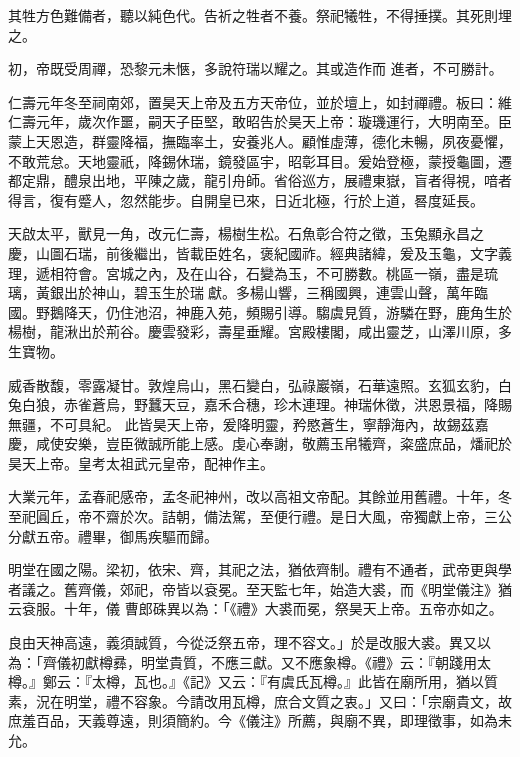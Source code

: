 \begin{pinyinscope}
 其牲方色難備者，聽以純色代。告祈之牲者不養。祭祀犧牲，不得捶撲。其死則埋之。



 初，帝既受周禪，恐黎元未愜，多說符瑞以耀之。其或造作而
 進者，不可勝計。



 仁壽元年冬至祠南郊，置昊天上帝及五方天帝位，並於壇上，如封禪禮。板曰：維仁壽元年，歲次作噩，嗣天子臣堅，敢昭告於昊天上帝：璇璣運行，大明南至。臣蒙上天恩造，群靈降福，撫臨率土，安養兆人。顧惟虛薄，德化未暢，夙夜憂懼，不敢荒怠。天地靈祇，降錫休瑞，鏡發區宇，昭彰耳目。爰始登極，蒙授龜圖，遷都定鼎，醴泉出地，平陳之歲，龍引舟師。省俗巡方，展禮東嶽，盲者得視，喑者得言，復有蹙人，忽然能步。自開皇已來，日近北極，行於上道，晷度延長。



 天啟太平，獸見一角，改元仁壽，楊樹生松。石魚彰合符之徵，玉兔顯永昌之
 慶，山圖石瑞，前後繼出，皆載臣姓名，褒紀國祚。經典諸緯，爰及玉龜，文字義理，遞相符會。宮城之內，及在山谷，石變為玉，不可勝數。桃區一嶺，盡是琉璃，黃銀出於神山，碧玉生於瑞獻。多楊山響，三稱國興，連雲山聲，萬年臨國。野鵝降天，仍住池沼，神鹿入苑，頻賜引導。騶虞見質，游驎在野，鹿角生於楊樹，龍湫出於荊谷。慶雲發彩，壽星垂耀。宮殿樓閣，咸出靈芝，山澤川原，多生寶物。



 威香散馥，零露凝甘。敦煌烏山，黑石變白，弘祿巖嶺，石華遠照。玄狐玄豹，白兔白狼，赤雀蒼烏，野蠶天豆，嘉禾合穗，珍木連理。神瑞休徵，洪恩景福，降賜無疆，不可具紀。
 此皆昊天上帝，爰降明靈，矜愍蒼生，寧靜海內，故錫茲嘉慶，咸使安樂，豈臣微誠所能上感。虔心奉謝，敬薦玉帛犧齊，粢盛庶品，燔祀於昊天上帝。皇考太祖武元皇帝，配神作主。



 大業元年，孟春祀感帝，孟冬祀神州，改以高祖文帝配。其餘並用舊禮。十年，冬至祀圓丘，帝不齋於次。詰朝，備法駕，至便行禮。是日大風，帝獨獻上帝，三公分獻五帝。禮畢，御馬疾驅而歸。



 明堂在國之陽。梁初，依宋、齊，其祀之法，猶依齊制。禮有不通者，武帝更與學者議之。舊齊儀，郊祀，帝皆以袞冕。至天監七年，始造大裘，而《明堂儀注》猶云袞服。十年，儀
 曹郎硃異以為：「《禮》大裘而冕，祭昊天上帝。五帝亦如之。



 良由天神高遠，義須誠質，今從泛祭五帝，理不容文。」於是改服大裘。異又以為：「齊儀初獻樽彞，明堂貴質，不應三獻。又不應象樽。《禮》云：『朝踐用太樽。』鄭云：『太樽，瓦也。』《記》又云：『有虞氏瓦樽。』此皆在廟所用，猶以質素，況在明堂，禮不容象。今請改用瓦樽，庶合文質之衷。」又曰：「宗廟貴文，故庶羞百品，天義尊遠，則須簡約。今《儀注》所薦，與廟不異，即理徵事，如為未允。




\end{pinyinscope}
